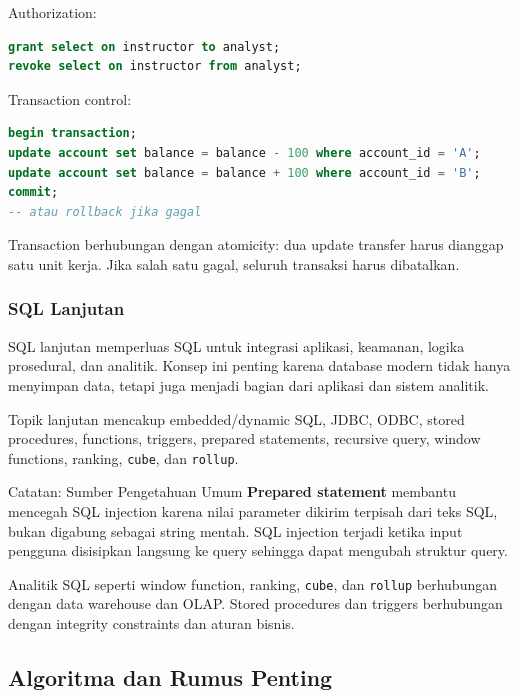 Authorization:
\begin{lstlisting}[language=SQL, caption={Grant dan revoke}, label={lst:sql-auth}]
grant select on instructor to analyst;
revoke select on instructor from analyst;
\end{lstlisting}

Transaction control:
\begin{lstlisting}[language=SQL, caption={Commit dan rollback}, label={lst:sql-transaction}]
begin transaction;
update account set balance = balance - 100 where account_id = 'A';
update account set balance = balance + 100 where account_id = 'B';
commit;
-- atau rollback jika gagal
\end{lstlisting}

Transaction berhubungan dengan atomicity: dua update transfer harus dianggap satu unit kerja. Jika salah satu gagal, seluruh transaksi harus dibatalkan.

\subsubsection{SQL Lanjutan}

\begin{jawab}
SQL lanjutan memperluas SQL untuk integrasi aplikasi, keamanan, logika prosedural, dan analitik. Konsep ini penting karena database modern tidak hanya menyimpan data, tetapi juga menjadi bagian dari aplikasi dan sistem analitik.
\end{jawab}

Topik lanjutan mencakup embedded/dynamic SQL, JDBC, ODBC, stored procedures, functions, triggers, prepared statements, recursive query, window functions, ranking, \texttt{cube}, dan \texttt{rollup}.

\begin{cmt}{Catatan: Sumber Pengetahuan Umum}{}
\textbf{Prepared statement} membantu mencegah SQL injection karena nilai parameter dikirim terpisah dari teks SQL, bukan digabung sebagai string mentah. SQL injection terjadi ketika input pengguna disisipkan langsung ke query sehingga dapat mengubah struktur query.
\end{cmt}

Analitik SQL seperti window function, ranking, \texttt{cube}, dan \texttt{rollup} berhubungan dengan data warehouse dan OLAP. Stored procedures dan triggers berhubungan dengan integrity constraints dan aturan bisnis.

\subsection{Algoritma dan Rumus Penting}


